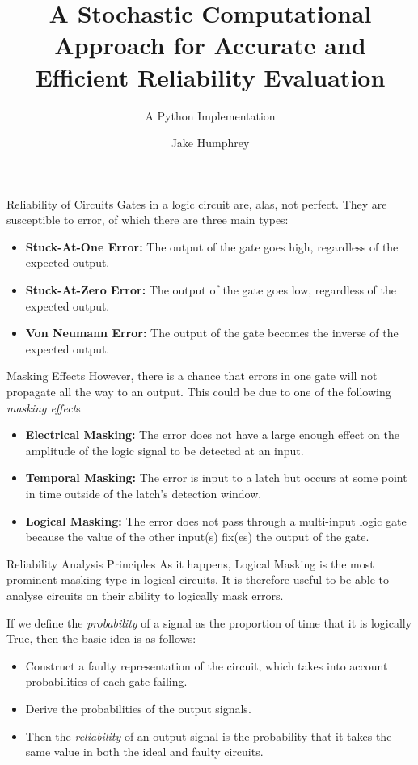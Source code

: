 \documentclass[12pt]{beamer}
\author{Jake Humphrey}
\title{A Stochastic Computational Approach for Accurate and Efficient Reliability Evaluation}
\subtitle{A Python Implementation}
\institute{Department of Electronic and Electrical Engineering\\
  Imperial College London\\
  \texttt{jbh111@ic.ac.uk}
}
\begin{document}
\begin{frame}[plain]
  \titlepage
\end{frame}

\begin{frame}{Reliability of Circuits}
Gates in a logic circuit are, alas, not perfect. They are susceptible to error, of which there are three main types:
\begin{itemize}
\item \textbf{Stuck-At-One Error:} The output of the gate goes high, regardless of the expected output.
\item \textbf{Stuck-At-Zero Error:} The output of the gate goes low, regardless of the expected output.
\item \textbf{Von Neumann Error:} The output of the gate becomes the inverse of the expected output.
\end{itemize}
\end{frame}

\begin{frame}{Masking Effects}
However, there is a chance that errors in one gate will not propagate all the way to an output. This could be due to one of the following \emph{masking effect}s
\begin{itemize}
\item \textbf{Electrical Masking:} The error does not have a large enough effect on the amplitude of the logic signal to be detected at an input.
\item \textbf{Temporal Masking:} The error is input to a latch but occurs at some point in time outside of the latch's detection window.
\item \textbf{Logical Masking:} The error does not pass through a multi-input logic gate because the value of the other input(s) fix(es) the output of the gate.
\end{itemize}
\end{frame}
\begin{frame}{Reliability Analysis \small Principles}
As it happens, Logical Masking is the most prominent masking type in logical circuits. It is therefore useful to be able to analyse circuits on their ability to logically mask errors.
\vspace{0.25cm}

If we define the \emph{probability} of a signal as the proportion of time that it is logically True, then the basic idea is as follows:
\begin{itemize}
\item Construct a faulty representation of the circuit, which takes into account probabilities of each gate failing.
\item Derive the probabilities of the output signals.%
\item Then the \emph{reliability} of an output signal is the probability that it takes the same value in both the ideal and faulty circuits.
\end{itemize}
\end{frame}
\end{document}
